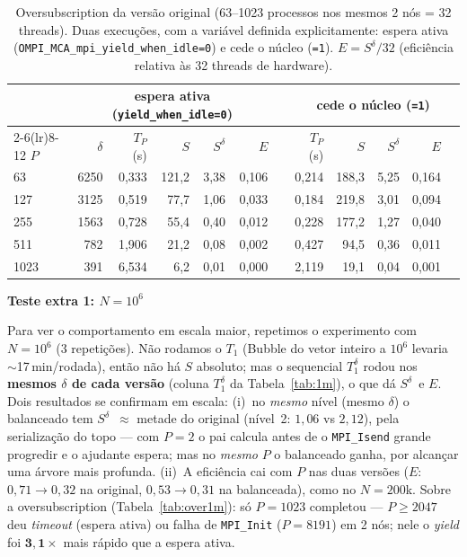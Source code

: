 \documentclass[10pt]{article}
\newcommand{\sd}{\ensuremath{S^{\delta}}}
\begin{document}
\begin{table}[htbp]\centering\footnotesize
\caption{Oversubscription da versão original (63--1023 processos nos mesmos 2 nós = 32 threads).
Duas execuções, com a variável definida explicitamente: espera ativa
(\texttt{OMPI\_MCA\_mpi\_yield\_when\_idle=0}) e cede o núcleo
(\texttt{=1}). $E=\sd/32$ (eficiência relativa às 32 threads de hardware).}
\label{tab:over}
\begin{tabular}{l r r r r r r @{\hskip 2em} r r r r r}
\toprule
 & \multicolumn{5}{c}{espera ativa (\texttt{yield\_when\_idle=0})} & & \multicolumn{5}{c}{cede o núcleo (\texttt{=1})}\\
\cmidrule(lr){2-6}\cmidrule(lr){8-12}
$P$ & $\delta$ & $T_P$ (s) & $S$ & \sd & $E$ & & $T_P$ (s) & $S$ & \sd & $E$\\
\midrule
  63 & 6250 & 0,333 & 121,2 & 3,38 & 0,106 & & 0,214 & 188,3 & 5,25 & 0,164\\
 127 & 3125 & 0,519 &  77,7 & 1,06 & 0,033 & & 0,184 & 219,8 & 3,01 & 0,094\\
 255 & 1563 & 0,728 &  55,4 & 0,40 & 0,012 & & 0,228 & 177,2 & 1,27 & 0,040\\
 511 &  782 & 1,906 &  21,2 & 0,08 & 0,002 & & 0,427 &  94,5 & 0,36 & 0,011\\
1023 &  391 & 6,534 &   6,2 & 0,01 & 0,000 & & 2,119 &  19,1 & 0,04 & 0,001\\
\bottomrule
\end{tabular}
\end{table}

\vspace{4pt}
\textbf{\large Teste extra 1: $N = 10^6$}

Para ver o comportamento em escala maior, repetimos o experimento com $N{=}10^6$ (3 repetições). Não
rodamos o $T_1$ (Bubble do vetor inteiro a $10^6$ levaria $\sim$17\,min/rodada), então não há $S$
absoluto; mas o sequencial $T_1^{\delta}$ rodou nos \textbf{mesmos $\delta$ de cada versão} (coluna
$T_1^{\delta}$ da Tabela~\ref{tab:1m}), o que dá \sd\ e $E$. Dois resultados se confirmam em escala:
(i)~no \emph{mesmo} nível (mesmo $\delta$) o balanceado tem \sd\ $\approx$ metade do original (nível~2:
$1{,}06$ vs $2{,}12$), pela serialização do topo --- com $P{=}2$ o pai calcula antes de o
\texttt{MPI\_Isend} grande progredir e o ajudante espera; mas no \emph{mesmo} $P$ o balanceado ganha, por
alcançar uma árvore mais profunda. (ii)~A eficiência cai com $P$ nas duas versões ($E$: $0{,}71\to0{,}32$
na original, $0{,}53\to0{,}31$ na balanceada), como no $N{=}200$k. Sobre a oversubscription
(Tabela~\ref{tab:over1m}): só $P{=}1023$ completou --- $P\ge2047$ deu \emph{timeout} (espera ativa) ou
falha de \texttt{MPI\_Init} ($P{=}8191$) em 2 nós; nele o \emph{yield} foi $\mathbf{3{,}1\times}$ mais
rápido que a espera ativa.
\end{document}
